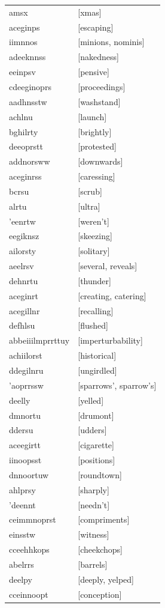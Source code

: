 \documentclass{article}
\begin{document}
\begin{tabular}{ll}
amsx & [xmas] \\
aceginps & [escaping] \\
iimnnos & [minions, nominis] \\
adeeknnss & [nakedness] \\
eeinpsv & [pensive] \\
cdeeginoprs & [proceedings] \\
aadhnsstw & [washstand] \\
achlnu & [launch] \\
bghilrty & [brightly] \\
deeoprstt & [protested] \\
addnorsww & [downwards] \\
aceginrss & [caressing] \\
bcrsu & [scrub] \\
alrtu & [ultra] \\
'eenrtw & [weren't] \\
eegiknsz & [skeezing] \\
ailorsty & [solitary] \\
aeelrsv & [several, reveals] \\
dehnrtu & [thunder] \\
aceginrt & [creating, catering] \\
acegillnr & [recalling] \\
defhlsu & [flushed] \\
abbeiiilmprrttuy & [imperturbability] \\
achiilorst & [historical] \\
ddegilnru & [ungirdled] \\
'aoprrssw & [sparrows', sparrow's] \\
deelly & [yelled] \\
dmnortu & [drumont] \\
ddersu & [udders] \\
aceegirtt & [cigarette] \\
iinoopsst & [positions] \\
dnnoortuw & [roundtown] \\
ahlprsy & [sharply] \\
'deennt & [needn't] \\
ceimmnoprst & [compriments] \\
einsstw & [witness] \\
cceehhkops & [cheekchops] \\
abelrrs & [barrels] \\
deelpy & [deeply, yelped] \\
cceinnoopt & [conception] \\

\end{tabular}
\end{document}
